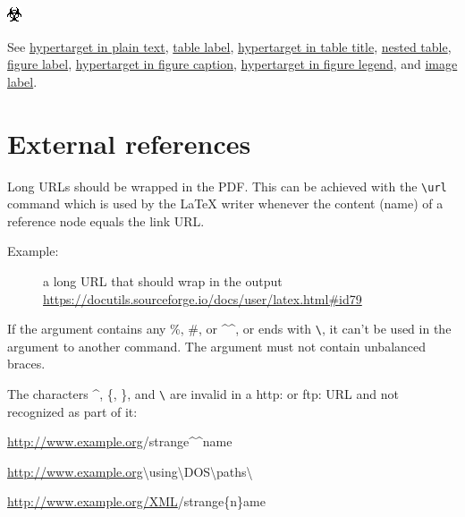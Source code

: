 \documentclass[a4paper]{article}
\newenvironment{DUlineblock}[1]{%
    \list{}{\setlength{\partopsep}{\parskip}
            \addtolength{\partopsep}{\baselineskip}
            \setlength{\topsep}{0pt}
            \setlength{\itemsep}{0.15\baselineskip}
            \setlength{\parsep}{0pt}
            \setlength{\leftmargin}{#1}}
    \raggedright
  }
  {\endlist}
\begin{document}
\includegraphics{../../../docs/user/rst/images/biohazard.png}
\label{image-label}

See \hyperref[hypertarget-in-plain-text]{hypertarget in plain text},
\hyperref[table-label]{table label}, \hyperref[hypertarget-in-table-title]{hypertarget in table title},
\hyperref[nested-table]{nested table},
\hyperref[figure-label]{figure label}, \hyperref[hypertarget-in-figure-caption]{hypertarget in figure caption},
\hyperref[hypertarget-in-figure-legend]{hypertarget in figure legend}, and
\hyperref[image-label]{image label}.


\section{External references%
  \label{external-references}%
}

Long URLs should be wrapped in the PDF. This can be achieved with the
\texttt{\textbackslash{}url} command which is used by the LaTeX writer whenever the content
(name) of a reference node equals the link URL.

\begin{description}
\item[{Example:}] 
a long URL that should wrap in the output
\url{https://docutils.sourceforge.io/docs/user/latex.html\#id79}

\end{description}

If the argument contains any \textquotedbl{}\%\textquotedbl{}, \textquotedbl{}\#\textquotedbl{}, or \textquotedbl{}\textasciicircum{}\textasciicircum{}\textquotedbl{}, or ends with \texttt{\textbackslash{}}, it can't
be used in the argument to another command. The argument must not contain
unbalanced braces.

The characters \textasciicircum{}, \{, \}, and \texttt{\textbackslash{}} are invalid in a \textquotedbl{}http:\textquotedbl{} or \textquotedbl{}ftp:\textquotedbl{} URL
and not recognized as part of it:

\begin{DUlineblock}{0em}
\item[] \url{http://www.example.org}/strange\textasciicircum{}\textasciicircum{}name
\item[] \url{http://www.example.org}\textbackslash{}using\textbackslash{}DOS\textbackslash{}paths\textbackslash{}
\item[] \url{http://www.example.org/XML}/strange\{n\}ame
\end{DUlineblock}
\end{document}
